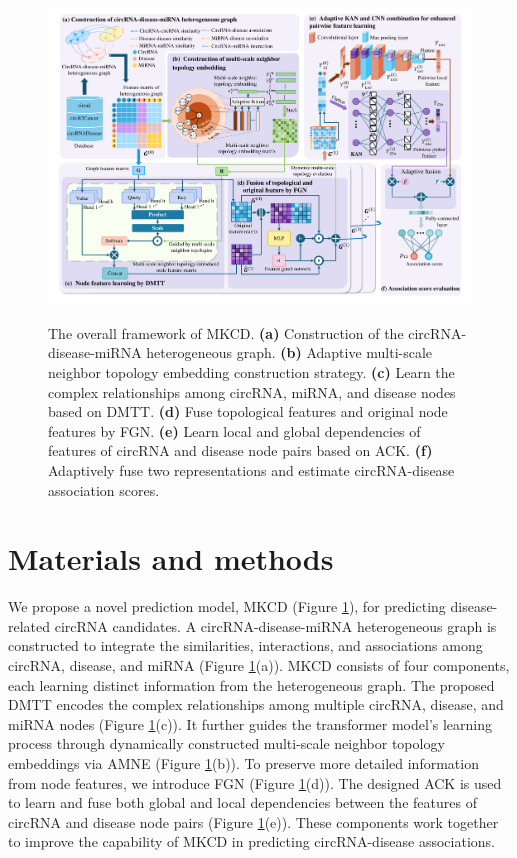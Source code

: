\documentclass[journal,twoside,web]{ieeecolor}
\begin{document}
\begin{figure}
	\centering
	\includegraphics[width=6.9in]{fig/visio1.pdf}\\
	\caption{The overall framework of MKCD. {\textbf{(a)} Construction of the circRNA-disease-miRNA heterogeneous graph. \textbf{(b)} Adaptive multi-scale neighbor topology embedding construction strategy. \textbf{(c)} Learn the complex relationships among circRNA, miRNA, and disease nodes based on DMTT. \textbf{(d)} Fuse topological features and original node features by FGN. \textbf{(e)} Learn local and global dependencies of features of circRNA and disease node pairs based on ACK. \textbf{(f)} Adaptively fuse two representations and estimate circRNA-disease association scores.}}
    \label{fig:visio1}
	\vspace{-0.4cm}
\end{figure}

\section{Materials and methods}
We propose a novel prediction model, MKCD (Figure \ref{fig:visio1}), for predicting disease-related circRNA candidates. A circRNA-disease-miRNA heterogeneous graph is constructed to integrate the similarities, interactions, and associations among circRNA, disease, and miRNA (Figure \ref{fig:visio1}(a)). MKCD consists of four components, each learning distinct information from the heterogeneous graph. The proposed DMTT encodes the complex relationships among multiple circRNA, disease, and miRNA nodes (Figure \ref{fig:visio1}(c)). It further guides the transformer model's learning process through dynamically constructed multi-scale neighbor topology embeddings via AMNE (Figure \ref{fig:visio1}(b)). To preserve more detailed information from node features, we introduce FGN (Figure \ref{fig:visio1}(d)). The designed ACK is used to learn and fuse both global and local dependencies between the features of circRNA and disease node pairs (Figure \ref{fig:visio1}(e)). These components work together to improve the capability of MKCD in predicting circRNA-disease associations.
\end{document}
